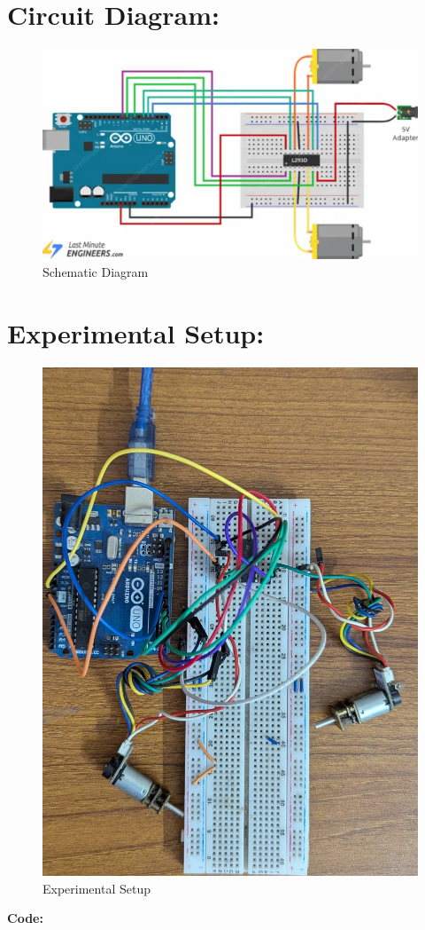 \documentclass[a4paper,12pt]{article}
\begin{document}
	
	\section*{Circuit Diagram:}
		\begin{figure}[H]
		\centering
		\includegraphics[width=1\linewidth, height=.3\textheight]{"Images/1"}
		\caption{Schematic Diagram}
	\end{figure}
	
	\section*{Experimental Setup:}
		\begin{figure}[H]
		\centering
		\includegraphics[angle=270,width=0.81 \linewidth]{"Images/3"}
		\caption{Experimental Setup}
	\end{figure}
	\newpage
	\vspace{0.5cm}
	\textbf{Code:}
	
\end{document}
